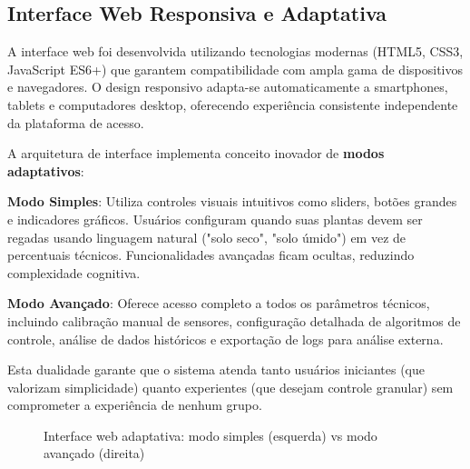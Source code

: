 \subsection{Interface Web Responsiva e Adaptativa}

A interface web foi desenvolvida utilizando tecnologias modernas (HTML5, CSS3, JavaScript ES6+) que garantem compatibilidade com ampla gama de dispositivos e navegadores. O design responsivo adapta-se automaticamente a smartphones, tablets e computadores desktop, oferecendo experiência consistente independente da plataforma de acesso.

A arquitetura de interface implementa conceito inovador de \textbf{modos adaptativos}:

\textbf{Modo Simples}: Utiliza controles visuais intuitivos como sliders, botões grandes e indicadores gráficos. Usuários configuram quando suas plantas devem ser regadas usando linguagem natural ("solo seco", "solo úmido") em vez de percentuais técnicos. Funcionalidades avançadas ficam ocultas, reduzindo complexidade cognitiva.

\textbf{Modo Avançado}: Oferece acesso completo a todos os parâmetros técnicos, incluindo calibração manual de sensores, configuração detalhada de algoritmos de controle, análise de dados históricos e exportação de logs para análise externa.

Esta dualidade garante que o sistema atenda tanto usuários iniciantes (que valorizam simplicidade) quanto experientes (que desejam controle granular) sem comprometer a experiência de nenhum grupo.

\begin{figure}[htbp]
\centering
\caption{Interface web adaptativa: modo simples (esquerda) vs modo avançado (direita)}
\label{fig:interface_web}
\end{figure}

